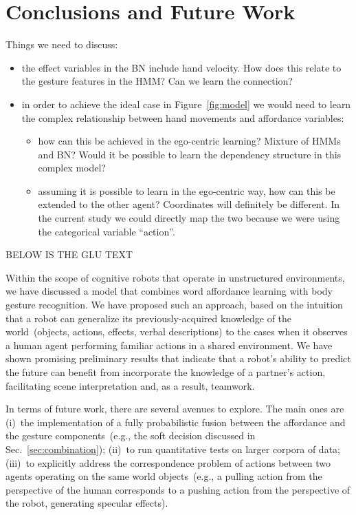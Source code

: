 
\section{Conclusions and Future Work}

Things we need to discuss:
\begin{itemize}
\item the effect variables in the BN include hand velocity. How does this relate to the gesture features in the HMM? Can we learn the connection?
\item in order to achieve the ideal case in Figure~\ref{fig:model} we would need to learn the complex relationship between hand movements and affordance variables:
  \begin{itemize}
  \item how can this be achieved in the ego-centric learning? Mixture of HMMs and BN? Would it be possible to learn the dependency structure in this complex model?
  \item assuming it is possible to learn in the ego-centric way, how can this be extended to the other agent? Coordinates will definitely be different. In the current study we could directly map the two because we were using the categorical variable ``action''.
  \end{itemize}
\end{itemize}

BELOW IS THE GLU TEXT

Within the scope of cognitive robots that operate in unstructured environments, we have discussed a model that combines word affordance learning with body gesture recognition. We have proposed such an approach, based on the intuition that a robot can generalize its previously-acquired knowledge of the world~(objects, actions, effects, verbal descriptions) to the cases when it observes a human agent performing familiar actions in a shared \hr{} environment. We have shown promising preliminary results that indicate that a robot's ability to predict the future can benefit from incorporate the knowledge of a partner's action, facilitating scene interpretation and, as a result, teamwork.

In terms of future work, there are several avenues to explore. The main ones are (i)~the implementation of a fully probabilistic fusion between the affordance and the gesture components~(e.g., the soft decision discussed in Sec.~\ref{sec:combination}); (ii)~to run quantitative tests on larger corpora of \hr{} data; (iii)~to explicitly address the correspondence problem of actions between two agents operating on the same world objects~(e.g., a pulling action from the perspective of the human corresponds to a pushing action from the perspective of the robot, generating specular effects).
